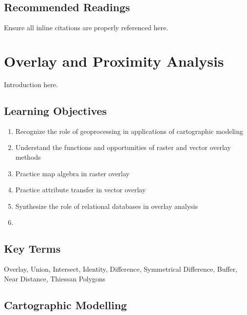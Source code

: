 \documentclass[
]{book}
\providecommand{\tightlist}{%
  \setlength{\itemsep}{0pt}\setlength{\parskip}{0pt}}
\begin{document}
\hypertarget{recommended-readings}{%
\section*{Recommended Readings}\label{recommended-readings}}

Ensure all inline citations are properly referenced here.

\hypertarget{overlay-and-proximity-analysis}{%
\chapter{Overlay and Proximity Analysis}\label{overlay-and-proximity-analysis}}

Introduction here.

\hypertarget{learning-objectives-5}{%
\section*{Learning Objectives}\label{learning-objectives-5}}

\begin{enumerate}
\def\labelenumi{\arabic{enumi}.}
\tightlist
\item
  Recognize the role of geoprocessing in applications of cartographic modeling
\item
  Understand the functions and opportunities of raster and vector overlay methods
\item
  Practice map algebra in raster overlay
\item
  Practice attribute transfer in vector overlay
\item
  Synthesize the role of relational databases in overlay analysis
\item
\end{enumerate}

\hypertarget{key-terms-5}{%
\section*{Key Terms}\label{key-terms-5}}

Overlay, Union, Intersect, Identity, Difference, Symmetrical Difference, Buffer, Near Distance, Thiessan Polygons

\hypertarget{cartographic-modelling}{%
\section{Cartographic Modelling}\label{cartographic-modelling}}
\end{document}
